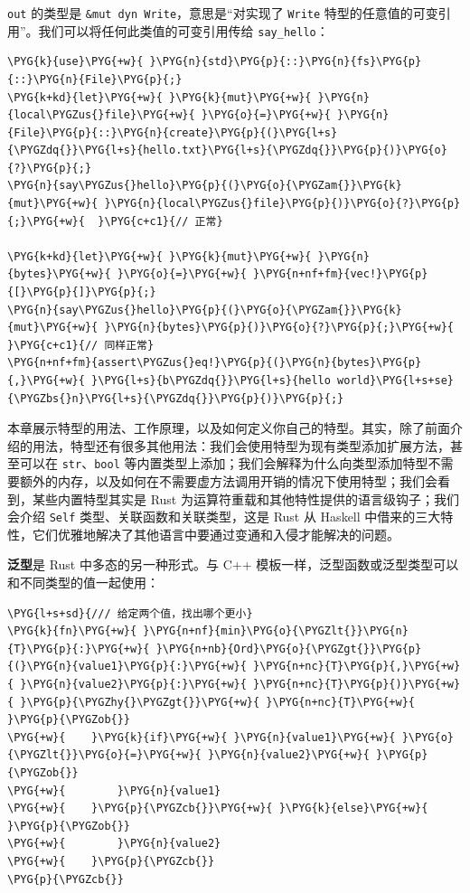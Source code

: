 \texttt{out} 的类型是 \texttt{\&mut dyn Write}，意思是“对实现了 \texttt{Write} 特型的任意值的可变引用”。我们可以将任何此类值的可变引用传给 \texttt{say\_hello}：

\begin{Verbatim}[commandchars=\\\{\},breaklines=true,breakanywhere=true,fontsize=\codefont,xleftmargin=17bp]
\PYG{k}{use}\PYG{+w}{ }\PYG{n}{std}\PYG{p}{::}\PYG{n}{fs}\PYG{p}{::}\PYG{n}{File}\PYG{p}{;}
\PYG{k+kd}{let}\PYG{+w}{ }\PYG{k}{mut}\PYG{+w}{ }\PYG{n}{local\PYGZus{}file}\PYG{+w}{ }\PYG{o}{=}\PYG{+w}{ }\PYG{n}{File}\PYG{p}{::}\PYG{n}{create}\PYG{p}{(}\PYG{l+s}{\PYGZdq{}}\PYG{l+s}{hello.txt}\PYG{l+s}{\PYGZdq{}}\PYG{p}{)}\PYG{o}{?}\PYG{p}{;}
\PYG{n}{say\PYGZus{}hello}\PYG{p}{(}\PYG{o}{\PYGZam{}}\PYG{k}{mut}\PYG{+w}{ }\PYG{n}{local\PYGZus{}file}\PYG{p}{)}\PYG{o}{?}\PYG{p}{;}\PYG{+w}{  }\PYG{c+c1}{// 正常}

\PYG{k+kd}{let}\PYG{+w}{ }\PYG{k}{mut}\PYG{+w}{ }\PYG{n}{bytes}\PYG{+w}{ }\PYG{o}{=}\PYG{+w}{ }\PYG{n+nf+fm}{vec!}\PYG{p}{[}\PYG{p}{]}\PYG{p}{;}
\PYG{n}{say\PYGZus{}hello}\PYG{p}{(}\PYG{o}{\PYGZam{}}\PYG{k}{mut}\PYG{+w}{ }\PYG{n}{bytes}\PYG{p}{)}\PYG{o}{?}\PYG{p}{;}\PYG{+w}{  }\PYG{c+c1}{// 同样正常}
\PYG{n+nf+fm}{assert\PYGZus{}eq!}\PYG{p}{(}\PYG{n}{bytes}\PYG{p}{,}\PYG{+w}{ }\PYG{l+s}{b\PYGZdq{}}\PYG{l+s}{hello world}\PYG{l+s+se}{\PYGZbs{}n}\PYG{l+s}{\PYGZdq{}}\PYG{p}{)}\PYG{p}{;}
\end{Verbatim}

本章展示特型的用法、工作原理，以及如何定义你自己的特型。其实，除了前面介绍的用法，特型还有很多其他用法：我们会使用特型为现有类型添加扩展方法，甚至可以在 \texttt{str}、\texttt{bool} 等内置类型上添加；我们会解释为什么向类型添加特型不需要额外的内存，以及如何在不需要虚方法调用开销的情况下使用特型；我们会看到，某些内置特型其实是 Rust 为运算符重载和其他特性提供的语言级钩子；我们会介绍 \texttt{Self} 类型、关联函数和关联类型，这是 Rust 从 Haskell 中借来的三大特性，它们优雅地解决了其他语言中要通过变通和入侵才能解决的问题。

\textbf{泛型}是 Rust 中多态的另一种形式。与 C++ 模板一样，泛型函数或泛型类型可以和不同类型的值一起使用：

\begin{Verbatim}[commandchars=\\\{\},breaklines=true,breakanywhere=true,fontsize=\codefont,xleftmargin=17bp]
\PYG{l+s+sd}{/// 给定两个值，找出哪个更小}
\PYG{k}{fn}\PYG{+w}{ }\PYG{n+nf}{min}\PYG{o}{\PYGZlt{}}\PYG{n}{T}\PYG{p}{:}\PYG{+w}{ }\PYG{n+nb}{Ord}\PYG{o}{\PYGZgt{}}\PYG{p}{(}\PYG{n}{value1}\PYG{p}{:}\PYG{+w}{ }\PYG{n+nc}{T}\PYG{p}{,}\PYG{+w}{ }\PYG{n}{value2}\PYG{p}{:}\PYG{+w}{ }\PYG{n+nc}{T}\PYG{p}{)}\PYG{+w}{ }\PYG{p}{\PYGZhy{}\PYGZgt{}}\PYG{+w}{ }\PYG{n+nc}{T}\PYG{+w}{ }\PYG{p}{\PYGZob{}}
\PYG{+w}{    }\PYG{k}{if}\PYG{+w}{ }\PYG{n}{value1}\PYG{+w}{ }\PYG{o}{\PYGZlt{}}\PYG{o}{=}\PYG{+w}{ }\PYG{n}{value2}\PYG{+w}{ }\PYG{p}{\PYGZob{}}
\PYG{+w}{        }\PYG{n}{value1}
\PYG{+w}{    }\PYG{p}{\PYGZcb{}}\PYG{+w}{ }\PYG{k}{else}\PYG{+w}{ }\PYG{p}{\PYGZob{}}
\PYG{+w}{        }\PYG{n}{value2}
\PYG{+w}{    }\PYG{p}{\PYGZcb{}}
\PYG{p}{\PYGZcb{}}
\end{Verbatim}

